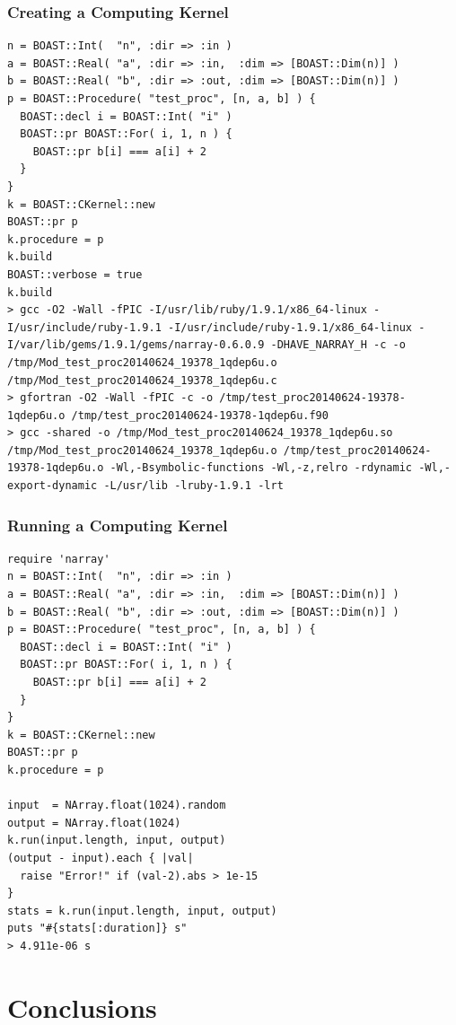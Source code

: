 \documentclass{beamer}
\begin{document}
\begin{frame}[fragile]
\frametitle{Creating a Computing Kernel}
\lstset{style=BOAST}
\tiny
\begin{lstlisting}
n = BOAST::Int(  "n", :dir => :in )
a = BOAST::Real( "a", :dir => :in,  :dim => [BOAST::Dim(n)] )
b = BOAST::Real( "b", :dir => :out, :dim => [BOAST::Dim(n)] )
p = BOAST::Procedure( "test_proc", [n, a, b] ) {
  BOAST::decl i = BOAST::Int( "i" )
  BOAST::pr BOAST::For( i, 1, n ) {
    BOAST::pr b[i] === a[i] + 2
  }
}
k = BOAST::CKernel::new
BOAST::pr p
k.procedure = p
k.build
BOAST::verbose = true
k.build
> gcc -O2 -Wall -fPIC -I/usr/lib/ruby/1.9.1/x86_64-linux -I/usr/include/ruby-1.9.1 -I/usr/include/ruby-1.9.1/x86_64-linux -I/var/lib/gems/1.9.1/gems/narray-0.6.0.9 -DHAVE_NARRAY_H -c -o /tmp/Mod_test_proc20140624_19378_1qdep6u.o /tmp/Mod_test_proc20140624_19378_1qdep6u.c
> gfortran -O2 -Wall -fPIC -c -o /tmp/test_proc20140624-19378-1qdep6u.o /tmp/test_proc20140624-19378-1qdep6u.f90
> gcc -shared -o /tmp/Mod_test_proc20140624_19378_1qdep6u.so /tmp/Mod_test_proc20140624_19378_1qdep6u.o /tmp/test_proc20140624-19378-1qdep6u.o -Wl,-Bsymbolic-functions -Wl,-z,relro -rdynamic -Wl,-export-dynamic -L/usr/lib -lruby-1.9.1 -lrt
\end{lstlisting}
\end{frame}

\begin{frame}[fragile]
\frametitle{Running a Computing Kernel}
\lstset{style=BOAST}
\tiny
\begin{lstlisting}
require 'narray'
n = BOAST::Int(  "n", :dir => :in )
a = BOAST::Real( "a", :dir => :in,  :dim => [BOAST::Dim(n)] )
b = BOAST::Real( "b", :dir => :out, :dim => [BOAST::Dim(n)] )
p = BOAST::Procedure( "test_proc", [n, a, b] ) {
  BOAST::decl i = BOAST::Int( "i" )
  BOAST::pr BOAST::For( i, 1, n ) {
    BOAST::pr b[i] === a[i] + 2
  }
}
k = BOAST::CKernel::new
BOAST::pr p
k.procedure = p

input  = NArray.float(1024).random
output = NArray.float(1024)
k.run(input.length, input, output)
(output - input).each { |val|
  raise "Error!" if (val-2).abs > 1e-15
}
stats = k.run(input.length, input, output)
puts "#{stats[:duration]} s"
> 4.911e-06 s
\end{lstlisting}
\end{frame}


\section{Conclusions}
\end{document}
